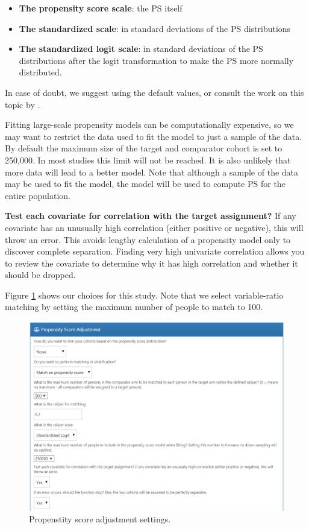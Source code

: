 \documentclass[11pt]{book}
\providecommand{\tightlist}{%
  \setlength{\itemsep}{0pt}\setlength{\parskip}{0pt}}
\theoremstyle{definition}
\theoremstyle{definition}
\theoremstyle{definition}
\theoremstyle{remark}
\begin{document}
\begin{itemize}
\tightlist
\item
  \textbf{The propensity score scale}: the PS itself
\item
  \textbf{The standardized scale}: in standard deviations of the PS distributions
\item
  \textbf{The standardized logit scale}: in standard deviations of the PS distributions after the logit transformation to make the PS more normally distributed.
\end{itemize}

In case of doubt, we suggest using the default values, or consult the work on this topic by \citet{austin_2011}.

Fitting large-scale propensity models can be computationally expensive, so we may want to restrict the data used to fit the model to just a sample of the data. By default the maximum size of the target and comparator cohort is set to 250,000. In most studies this limit will not be reached. It is also unlikely that more data will lead to a better model. Note that although a sample of the data may be used to fit the model, the model will be used to compute PS for the entire population.

\textbf{Test each covariate for correlation with the target assignment?} If any covariate has an unusually high correlation (either positive or negative), this will throw an error. This avoids lengthy calculation of a propensity model only to discover complete separation. Finding very high univariate correlation allows you to review the covariate to determine why it has high correlation and whether it should be dropped.

Figure \ref{fig:psSettings} shows our choices for this study. Note that we select variable-ratio matching by setting the maximum number of people to match to 100.

\begin{figure}

{\centering \includegraphics[width=1\linewidth]{images/PopulationLevelEstimation/psSettings} 

}

\caption{Propenstity score adjustment settings.}\label{fig:psSettings}
\end{figure}
\end{document}
